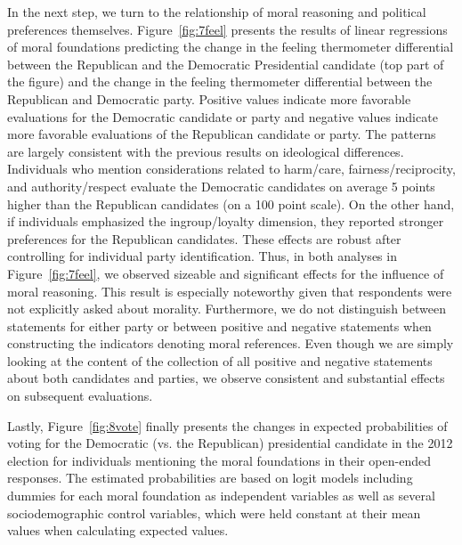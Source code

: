 \documentclass[12pt]{article}
\begin{document}
In the next step, we turn to the relationship of moral reasoning and political preferences themselves. Figure~\ref{fig:7feel} presents the results of linear regressions of moral foundations predicting the change in the feeling thermometer differential between the Republican and the Democratic Presidential candidate (top part of the figure) and the change in the feeling thermometer differential between the Republican and Democratic party. Positive values indicate more favorable evaluations for the Democratic candidate or party and negative values indicate more favorable evaluations of the Republican candidate or party. The patterns are largely consistent with the previous results on ideological differences. Individuals who mention considerations related to harm/care, fairness/reciprocity, and authority/respect evaluate the Democratic candidates on average 5 points higher than the Republican candidates (on a 100 point scale). On the other hand, if individuals emphasized the ingroup/loyalty dimension, they reported stronger preferences for the Republican candidates. These effects are robust after controlling for individual party identification. Thus, in both analyses in Figure~\ref{fig:7feel}, we observed sizeable and significant effects for the influence of moral reasoning. This result is especially noteworthy given that respondents were not explicitly asked about morality. Furthermore, we do not distinguish between statements for either party or between positive and negative statements when constructing the indicators denoting moral references. Even though we are simply looking at the content of the collection of all positive and negative statements about both candidates and parties, we observe consistent and substantial effects on subsequent evaluations.

\clearpage
Lastly, Figure~\ref{fig:8vote} finally presents the changes in expected probabilities of voting for the Democratic (vs. the Republican) presidential candidate in the 2012 election for individuals mentioning the moral foundations in their open-ended responses. The estimated probabilities are based on logit models including dummies for each moral foundation as independent variables as well as several sociodemographic control variables, which were held constant at their mean values when calculating expected values.
\end{document}
